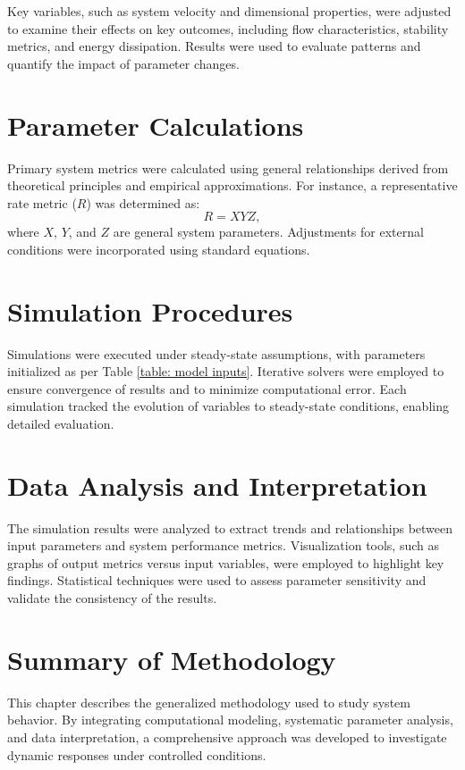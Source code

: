 Key variables, such as system velocity and dimensional properties, were adjusted to examine their effects on key outcomes, including flow characteristics, stability metrics, and energy dissipation. Results were used to evaluate patterns and quantify the impact of parameter changes.

\section{Parameter Calculations}
Primary system metrics were calculated using general relationships derived from theoretical principles and empirical approximations. For instance, a representative rate metric ($R$) was determined as:
\begin{equation}
    R = X Y Z,
\end{equation}
where \(X\), \(Y\), and \(Z\) are general system parameters. Adjustments for external conditions were incorporated using standard equations.

\section{Simulation Procedures}
Simulations were executed under steady-state assumptions, with parameters initialized as per Table \ref{table: model inputs}. Iterative solvers were employed to ensure convergence of results and to minimize computational error. Each simulation tracked the evolution of variables to steady-state conditions, enabling detailed evaluation.

\section{Data Analysis and Interpretation}
The simulation results were analyzed to extract trends and relationships between input parameters and system performance metrics. Visualization tools, such as graphs of output metrics versus input variables, were employed to highlight key findings. Statistical techniques were used to assess parameter sensitivity and validate the consistency of the results.

\section{Summary of Methodology}
This chapter describes the generalized methodology used to study system behavior. By integrating computational modeling, systematic parameter analysis, and data interpretation, a comprehensive approach was developed to investigate dynamic responses under controlled conditions.
